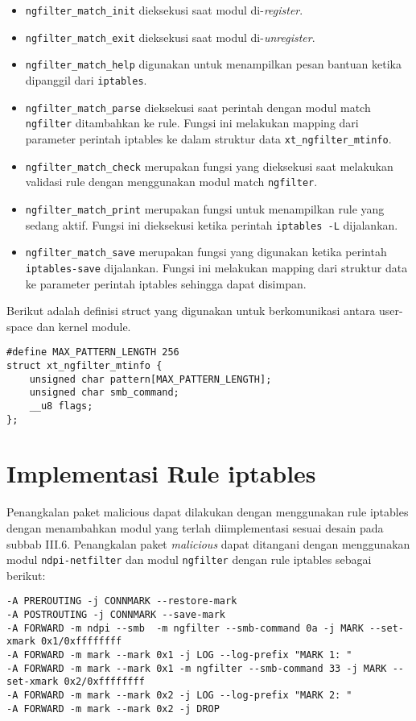 \begin{itemize}
\item \verb|ngfilter_match_init| dieksekusi saat modul di-\textit{register}.
\item \verb|ngfilter_match_exit| dieksekusi saat modul di-\textit{unregister}.
\item \verb|ngfilter_match_help| digunakan untuk menampilkan pesan bantuan ketika dipanggil dari \verb|iptables|.
\item \verb|ngfilter_match_parse| dieksekusi saat perintah dengan modul match \verb|ngfilter| ditambahkan ke rule. Fungsi ini melakukan mapping dari parameter perintah iptables ke dalam struktur data \verb|xt_ngfilter_mtinfo|.
\item \verb|ngfilter_match_check| merupakan fungsi yang dieksekusi saat melakukan validasi rule dengan menggunakan modul match \verb|ngfilter|.
\item \verb|ngfilter_match_print| merupakan fungsi untuk menampilkan rule yang sedang aktif. Fungsi ini dieksekusi ketika perintah \verb|iptables -L| dijalankan.
\item \verb|ngfilter_match_save| merupakan fungsi yang digunakan ketika perintah \verb|iptables-save| dijalankan. Fungsi ini melakukan mapping dari struktur data ke parameter perintah iptables sehingga dapat disimpan.
\end{itemize}

Berikut adalah definisi struct yang digunakan untuk berkomunikasi antara user-space dan kernel module.

\begin{lstlisting}
#define MAX_PATTERN_LENGTH 256
struct xt_ngfilter_mtinfo {
	unsigned char pattern[MAX_PATTERN_LENGTH];
	unsigned char smb_command;
	__u8 flags;
};
\end{lstlisting}

\section{Implementasi Rule iptables}

Penangkalan paket malicious dapat dilakukan dengan menggunakan rule iptables dengan menambahkan modul yang terlah diimplementasi sesuai desain pada subbab III.6. Penangkalan paket \textit{malicious} dapat ditangani dengan menggunakan modul \verb|ndpi-netfilter| dan modul \verb|ngfilter| dengan rule iptables sebagai berikut:

\begin{verbatim}
-A PREROUTING -j CONNMARK --restore-mark
-A POSTROUTING -j CONNMARK --save-mark
-A FORWARD -m ndpi --smb  -m ngfilter --smb-command 0a -j MARK --set-xmark 0x1/0xffffffff
-A FORWARD -m mark --mark 0x1 -j LOG --log-prefix "MARK 1: "
-A FORWARD -m mark --mark 0x1 -m ngfilter --smb-command 33 -j MARK --set-xmark 0x2/0xffffffff
-A FORWARD -m mark --mark 0x2 -j LOG --log-prefix "MARK 2: "
-A FORWARD -m mark --mark 0x2 -j DROP
\end{verbatim} 

